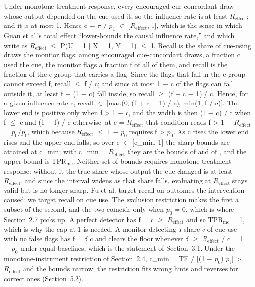 \documentclass[11pt]{article}
\begin{document}
Under monotone treatment response, every encouraged cue-concordant draw whose output depended on the cue used it, so the influence rate is at least $R_{\mathrm{effect}}$; and it is at most 1. Hence c = $\pi$ / $p_1$ $\in$ [$R_{\mathrm{effect}}$, 1], which is the sense in which Guan et al.’s total effect “lower-bounds the causal influence rate,” and which \citet*{guan2026beyond} write as $R_{\mathrm{effect}}$ $\leq$ P(U = 1 | X = 1, Y = 1) $\leq$ 1. Recall is the share of cue-using draws the monitor flags: among encouraged cue-concordant draws, a fraction c used the cue, the monitor flags a fraction f of all of them, and recall is the fraction of the c-group that carries a flag. Since the flags that fall in the c-group cannot exceed f, recall $\leq$ f / c; and since at most 1 $-$ c of the flags can fall outside it, at least f $-$ (1 $-$ c) fall inside, so recall $\geq$ (f + c $-$ 1) / c. Hence, for a given influence rate c, recall $\in$ [max(0, (f + c $-$ 1) / c), min(1, f / c)]. The lower end is positive only when f > 1 $-$ c, and the width is then (1 $-$ c) / c when f $\leq$ c and (1 $-$ f) / c otherwise; at c = $R_{\mathrm{effect}}$ that condition reads f > 1 $-$ $R_{\mathrm{effect}}$ = $p_0$/$p_1$, which because $R_{\mathrm{effect}}$ $\leq$ 1 $-$ $p_0$ requires f > $p_0$. As c rises the lower end rises and the upper end falls, so over c $\in$ [c\_min, 1] the sharp bounds are attained at c\_min; with c\_min = $R_{\mathrm{effect}}$ they are the bounds of \citet*{guan2026beyond} and of \citet{fu2026learning}, and the upper bound is $\mathrm{TPR}_{\mathrm{mc}}$. Neither set of bounds requires monotone treatment response: without it the true share whose output the cue changed is at least $R_{\mathrm{effect}}$, and since the interval widens as that share falls, evaluating at $R_{\mathrm{effect}}$ stays valid but is no longer sharp. Fu et al. target recall on outcomes the intervention caused; we target recall on cue use. The exclusion restriction makes the first a subset of the second, and the two coincide only when $p_0$ = 0, which is where Section~2.7 picks up. A perfect detector has f = c $\geq$ $R_{\mathrm{effect}}$ and so $\mathrm{TPR}_{\mathrm{mc}}$ = 1, which is why the cap at 1 is needed. A monitor detecting a share $\delta$ of cue use with no false flags has f = $\delta$ c and clears the floor whenever $\delta$ $\geq$ $R_{\mathrm{effect}}$ / c = 1 $-$ $p_0$ under equal baselines, which is the statement of Section~3.1. Under the monotone-instrument restriction of Section~2.4, c\_min = TE / [(1 $-$ $p_0$) $p_1$] > $R_{\mathrm{effect}}$ and the bounds narrow; the restriction fits wrong hints and reverses for correct ones (Section~5.2).
\end{document}
